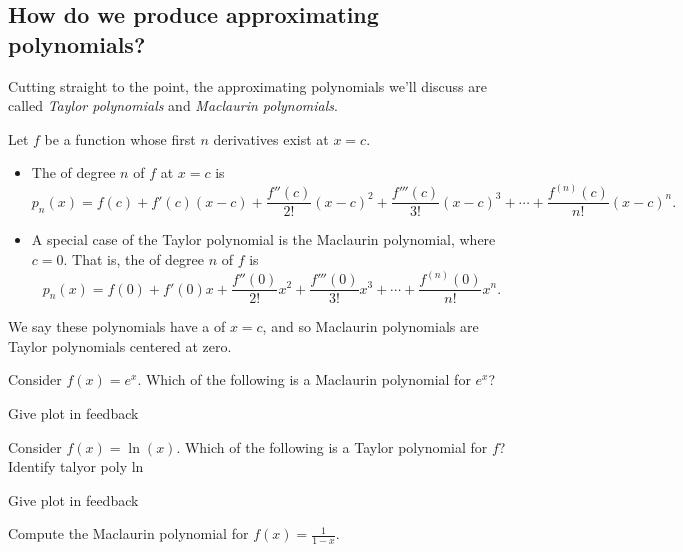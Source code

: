 \documentclass{ximera}
\begin{document}
\subsection{How do we produce approximating polynomials?}

Cutting straight to the point, the approximating polynomials we'll
discuss are called \textit{Taylor polynomials} and \textit{Maclaurin
  polynomials}.

\begin{definition}
  Let $f$ be a function whose first $n$ derivatives exist at $x=c$.
  \begin{itemize}
  \item The  of degree $n$ of $f$ at $x=c$ is
    \[
    p_n(x) = f(c) + f'(c)(x-c) + \frac{f''(c)}{2!}(x-c)^2+\frac{f'''(c)}{3!}(x-c)^3+\cdots+\frac{f^{(n)}(c)}{n!}(x-c)^n.
    \]
  \item A special case of the Taylor polynomial is the Maclaurin
    polynomial, where $c=0$. That is, the 
    of degree $n$ of $f$ is
    \[
    p_n(x) = f(0) + f'(0)x +\frac{f''(0)}{2!}x^2+\frac{f'''(0)}{3!}x^3+\cdots+\frac{f^{(n)}(0)}{n!}x^n.
    \]
  \end{itemize}
  We say these polynomials have a  of $x=c$, and so
  Maclaurin polynomials are Taylor polynomials centered at
  zero.
\end{definition}

\begin{question}
  Consider $f(x) = e^x$. Which of the following is a Maclaurin
  polynomial for $e^x$?
  \begin{multipleChoice}
  \end{multipleChoice}

  Give plot in feedback
\end{question}

\begin{question}
  Consider $f(x) = \ln(x)$. Which of the following is a Taylor polynomial for $f$?
  Identify talyor poly ln

  Give plot in feedback
\end{question}

\begin{example}
  Compute the Maclaurin polynomial for $f(x) = \frac{1}{1-x}$.
\end{example}
\end{document}
